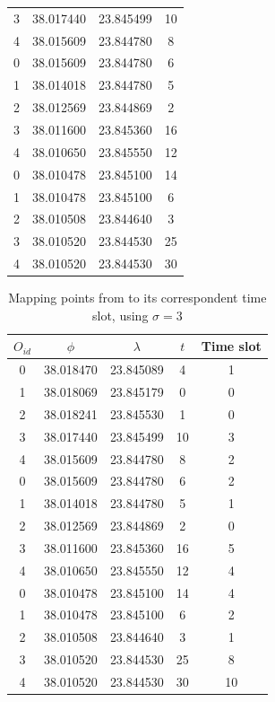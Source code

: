 \begin{table}
\begin{minipage}{0.5\textwidth}
\begin{tabular}{c c c c}
            3 & 38.017440 & 23.845499 & 10 \\
            4 & 38.015609 & 23.844780 & 8 \\
            \bottomrule
            0 & 38.015609 & 23.844780 & 6 \\
            1 & 38.014018 & 23.844780 & 5 \\
            2 & 38.012569 & 23.844869 & 2 \\
            3 & 38.011600 & 23.845360 & 16 \\
            4 & 38.010650 & 23.845550 & 12 \\
            \bottomrule
            0 & 38.010478 & 23.845100 & 14 \\
            1 & 38.010478 & 23.845100 & 6 \\
            2 & 38.010508 & 23.844640 & 3 \\
            3 & 38.010520 & 23.844530 & 25 \\
            4 & 38.010520 & 23.844530 & 30 \\
            \bottomrule
        \end{tabular}
    \end{minipage}
\end{table}

\begin{table}[h!]
    \centering
    \caption{Mapping points from  to its correspondent time slot, using $\sigma = 3$}
    \label{tbl:timeslot}
    \begin{tabular}{c c c c c}
        \toprule
        \textbf{$O_{id}$} & \textbf{$\phi$} & \textbf{$\lambda$} & \textbf{$t$} & \textbf{Time slot} \\
        \toprule
        0 & 38.018470 & 23.845089 & 4 & 1 \\
        1 & 38.018069 & 23.845179 & 0 & 0 \\
        2 & 38.018241 & 23.845530 & 1 & 0 \\
        3 & 38.017440 & 23.845499 & 10 & 3 \\
        4 & 38.015609 & 23.844780 & 8  & 2 \\
        \bottomrule
        0 & 38.015609 & 23.844780 & 6 & 2 \\
        1 & 38.014018 & 23.844780 & 5 & 1 \\
        2 & 38.012569 & 23.844869 & 2 & 0 \\
        3 & 38.011600 & 23.845360 & 16 & 5 \\
        4 & 38.010650 & 23.845550 & 12 & 4 \\
        \bottomrule
        0 & 38.010478 & 23.845100 & 14 & 4 \\
        1 & 38.010478 & 23.845100 & 6 & 2 \\
        2 & 38.010508 & 23.844640 & 3 & 1 \\
        3 & 38.010520 & 23.844530 & 25 & 8 \\
        4 & 38.010520 & 23.844530 & 30 & 10 \\
        \bottomrule
    \end{tabular}
\end{table}

